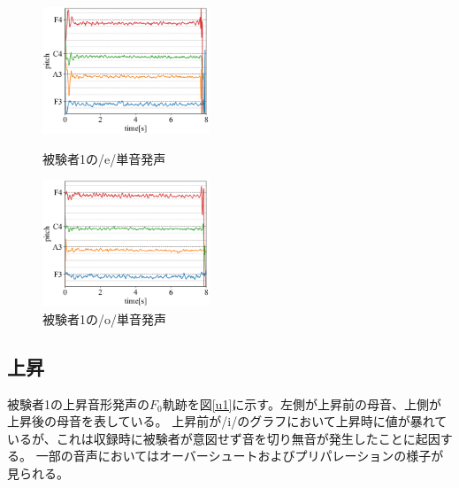\documentclass[10.5ptj,a4j,dvipdfmx,uplatex, oneside, openany, report]{jsbook}%
\begin{document}
\begin{figure}[htbp]
    \begin{minipage}{0.33\hsize}
        \begin{center}
            \includegraphics[width=5cm]{long/long_1_e.png}
            \caption{被験者1の/e/単音発声}
            \label{le}
        \end{center}
    \end{minipage}
    \begin{minipage}{0.33\hsize}
        \begin{center}
            \includegraphics[width=5cm]{long/long_1_o.png}
            \caption{被験者1の/o/単音発声}
            \label{lo}
        \end{center}
    \end{minipage}
    \begin{minipage}{0.33\hsize} 
    \end{minipage}
    
\end{figure}

\subsection{上昇}
被験者1の上昇音形発声の$F_0$軌跡を図\ref{u1}に示す。左側が上昇前の母音、上側が上昇後の母音を表している。
上昇前が/i/のグラフにおいて上昇時に値が暴れているが、これは収録時に被験者が意図せず音を切り無音が発生したことに起因する。
一部の音声においてはオーバーシュートおよびプリパレーションの様子が見られる。
\end{document}
